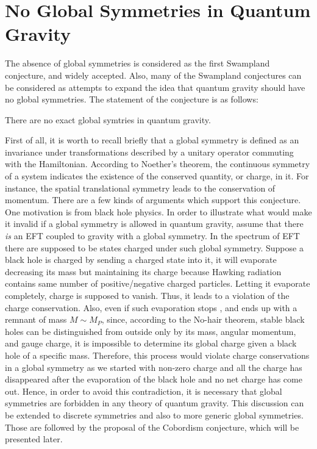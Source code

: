 \section{No Global Symmetries in Quantum Gravity}
The absence of global symmetries is considered as the first Swampland conjecture, and widely accepted. Also, many of the Swampland conjectures can be considered as attempts to expand the idea that quantum gravity should have no global symmetries. The statement of the conjecture is as follows:
\begin{tcolorbox}[title=No Global Symmetries Conjecture,
    title filled=false,
    colback=blue!5!white,
    colframe=blue!75!black]
    There are no exact global symtries in quantum gravity.  %
\end{tcolorbox} 
First of all, it is worth to recall briefly that a global symmetry is defined as an invariance under transformations described by a unitary operator commuting with the Hamiltonian. According to Noether's theorem, the continuous symmetry of a system indicates the existence of the conserved quantity, or charge, in it. For instance, the spatial translational symmetry leads to the conservation of momentum. There are a few kinds of arguments which support this conjecture. One motivation is from black hole physics. In order to illustrate what would make it invalid if a global symmetry is allowed in quantum gravity, assume that there \emph{is} an EFT coupled to gravity with a global symmetry. In the spectrum of EFT there are supposed to be states charged under such global symmetry. Suppose a black hole is charged by sending a charged state into it, it will evaporate decreasing its mass but maintaining its charge because Hawking radiation contains same number of positive/negative charged particles. Letting it evaporate completely, charge is supposed to vanish. Thus, it leads to a violation of the charge conservation. Also, even if such evaporation stops , and ends up with a remnant of mass $M \sim M_{P}$, since, according to the No-hair theorem, stable black holes can be distinguished from outside only by its mass, angular momentum, and gauge charge, it is impossible to determine its global charge given a black hole of a specific mass. Therefore, this process would violate charge conservations in a global symmetry as we started with non-zero charge and all the charge has disappeared after the evaporation of the black hole and no net charge has come out. Hence, in order to avoid this contradiction, it is necessary that global symmetries are forbidden in any theory of quantum gravity. This discussion can be extended to discrete symmetries and also to more generic global symmetries. Those are followed by the proposal of the Cobordism conjecture, which will be presented later.  \\
